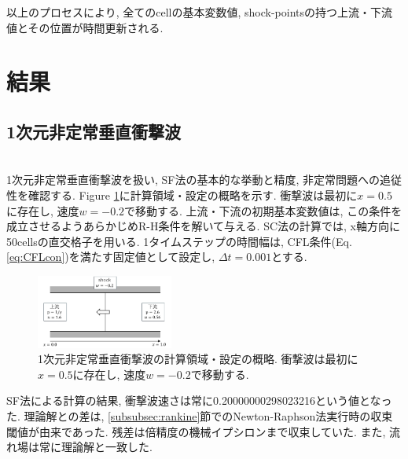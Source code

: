 \documentclass[a4j]{jarticle}
\begin{document}
以上のプロセスにより, 全てのcellの基本変数値, shock-pointsの持つ上流・下流値とその位置が時間更新される.

\section{結果}
\subsection{1次元非定常垂直衝撃波}\label{subsec:1D}
\mbox{}\\[-3.0ex]

1次元非定常垂直衝撃波を扱い, SF法の基本的な挙動と精度, 非定常問題への追従性を確認する.
Figure \ref{fig:1Dsituation}に計算領域・設定の概略を示す.
衝撃波は最初に$x=0.5$に存在し, 速度$w=-0.2$で移動する.
上流・下流の初期基本変数値は, この条件を成立させるようあらかじめR-H条件を解いて与える.
SC法の計算では, x軸方向に50cellsの直交格子を用いる.
1タイムステップの時間幅は, CFL条件(Eq.\ref{eq:CFLcon})を満たす固定値として設定し, $\Delta t = 0.001$とする.
\begin{figure}[H]
    \begin{center}
        \includegraphics[width=0.4\textwidth]{1Dsituation.pdf}
    \end{center}
    \caption{1次元非定常垂直衝撃波の計算領域・設定の概略.
    衝撃波は最初に$x=0.5$に存在し, 速度$w=-0.2$で移動する.}
    \label{fig:1Dsituation}
\end{figure}
SF法による計算の結果, 衝撃波速さは常に0.20000000298023216という値となった.
理論解との差は, \ref{subsubsec:rankine}節でのNewton-Raphson法実行時の収束閾値が由来であった. 
残差は倍精度の機械イプシロンまで収束していた. また, 流れ場は常に理論解と一致した.
\end{document}
